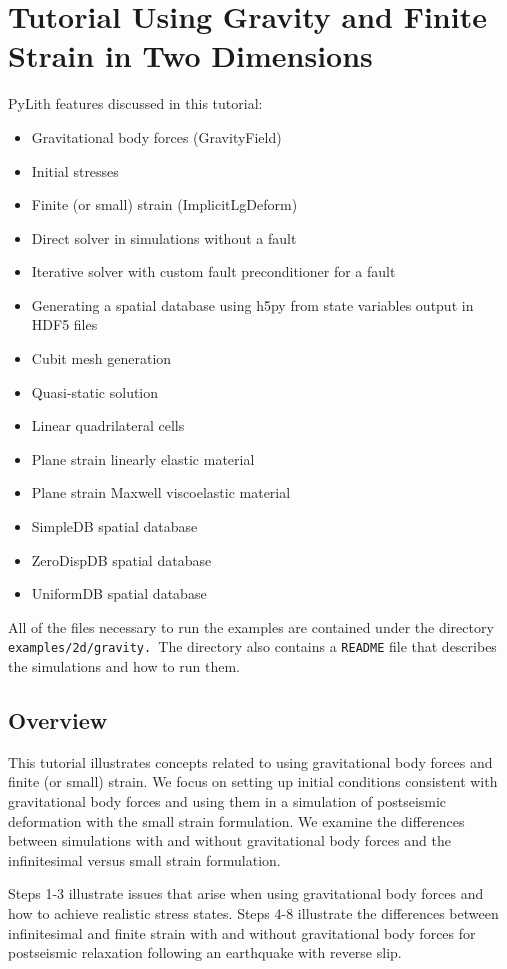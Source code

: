 
\section{\label{sec:Tutorial-Gravity-2d}Tutorial Using Gravity and Finite
Strain in Two Dimensions}

PyLith features discussed in this tutorial:
\begin{itemize}
\item Gravitational body forces (GravityField)
\item Initial stresses
\item Finite (or small) strain (ImplicitLgDeform)
\item Direct solver in simulations without a fault
\item Iterative solver with custom fault preconditioner for a fault
\item Generating a spatial database using h5py from state variables output
in HDF5 files
\item Cubit mesh generation
\item Quasi-static solution
\item Linear quadrilateral cells
\item Plane strain linearly elastic material
\item Plane strain Maxwell viscoelastic material
\item SimpleDB spatial database
\item ZeroDispDB spatial database
\item UniformDB spatial database
\end{itemize}
All of the files necessary to run the examples are contained under
the directory \texttt{examples/2d/gravity. }The directory also contains
a \texttt{README} file that describes the simulations and how to run
them.


\subsection{Overview}

This tutorial illustrates concepts related to using gravitational
body forces and finite (or small) strain. We focus on setting up initial
conditions consistent with gravitational body forces and using them
in a simulation of postseismic deformation with the small strain formulation.
We examine the differences between simulations with and without gravitational
body forces and the infinitesimal versus small strain formulation.

Steps 1-3 illustrate issues that arise when using gravitational body
forces and how to achieve realistic stress states. Steps 4-8 illustrate
the differences between infinitesimal and finite strain with and without
gravitational body forces for postseismic relaxation following an
earthquake with reverse slip.



